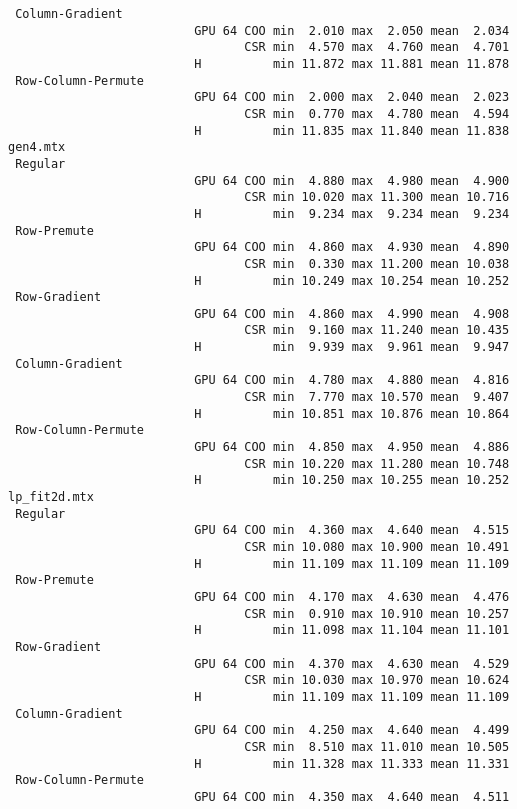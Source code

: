 {\begin{verbatim}
 Column-Gradient
                          GPU 64 COO min  2.010 max  2.050 mean  2.034
                                 CSR min  4.570 max  4.760 mean  4.701
                          H          min 11.872 max 11.881 mean 11.878
 Row-Column-Permute
                          GPU 64 COO min  2.000 max  2.040 mean  2.023
                                 CSR min  0.770 max  4.780 mean  4.594
                          H          min 11.835 max 11.840 mean 11.838
gen4.mtx
 Regular
                          GPU 64 COO min  4.880 max  4.980 mean  4.900
                                 CSR min 10.020 max 11.300 mean 10.716
                          H          min  9.234 max  9.234 mean  9.234
 Row-Premute
                          GPU 64 COO min  4.860 max  4.930 mean  4.890
                                 CSR min  0.330 max 11.200 mean 10.038
                          H          min 10.249 max 10.254 mean 10.252
 Row-Gradient
                          GPU 64 COO min  4.860 max  4.990 mean  4.908
                                 CSR min  9.160 max 11.240 mean 10.435
                          H          min  9.939 max  9.961 mean  9.947
 Column-Gradient
                          GPU 64 COO min  4.780 max  4.880 mean  4.816
                                 CSR min  7.770 max 10.570 mean  9.407
                          H          min 10.851 max 10.876 mean 10.864
 Row-Column-Permute
                          GPU 64 COO min  4.850 max  4.950 mean  4.886
                                 CSR min 10.220 max 11.280 mean 10.748
                          H          min 10.250 max 10.255 mean 10.252
lp_fit2d.mtx
 Regular
                          GPU 64 COO min  4.360 max  4.640 mean  4.515
                                 CSR min 10.080 max 10.900 mean 10.491
                          H          min 11.109 max 11.109 mean 11.109
 Row-Premute
                          GPU 64 COO min  4.170 max  4.630 mean  4.476
                                 CSR min  0.910 max 10.910 mean 10.257
                          H          min 11.098 max 11.104 mean 11.101
 Row-Gradient
                          GPU 64 COO min  4.370 max  4.630 mean  4.529
                                 CSR min 10.030 max 10.970 mean 10.624
                          H          min 11.109 max 11.109 mean 11.109
 Column-Gradient
                          GPU 64 COO min  4.250 max  4.640 mean  4.499
                                 CSR min  8.510 max 11.010 mean 10.505
                          H          min 11.328 max 11.333 mean 11.331
 Row-Column-Permute
                          GPU 64 COO min  4.350 max  4.640 mean  4.511

\end{verbatim}}
